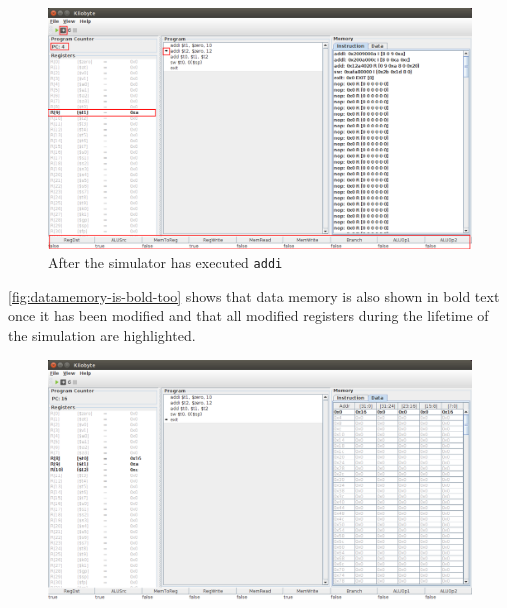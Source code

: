 \begin{figure}[H]
  \centering
  \includegraphics[width=\textwidth]{images/modified_registers_are_emboldened.png} 
  \caption{After the simulator has executed \texttt{addi}} 
  \label{fig:executed-addi}
\end{figure}

\autoref{fig:datamemory-is-bold-too} shows that data memory is also
shown in bold text once it has been modified and that all modified
registers during the lifetime of the simulation are highlighted.

\begin{figure}[H]
  \centering
  \includegraphics[width=\textwidth]{images/data_memory_is_also_emboldened.png} 
  \label{fig:datamemory-is-bold-too}
\end{figure}




\clearpage

\printbibliography


